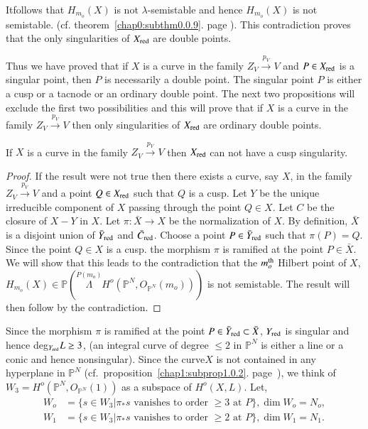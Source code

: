 {It\pageoriginale follows that $H_{m_o}(X)$ is not $\lambda$-semistable
and hence 
$H_{m_o}(X)$ is not semistable. (cf. theorem~\ref{chap0:subthm0.0.9}. 
page \pageref{chap0:subthm0.0.9}). This 
contradiction proves that the only singularities of $X_{\operatorname{red}} $ are
double points. 

Thus we have proved that if $X$ is a curve in the family $Z_V
\xrightarrow{p_V}V$ and $P \in X_{\operatorname{red}}$ is a singular point, then $P$
is necessarily a double point. The singular point $P$ is either a
cusp or a tacnode or an ordinary double point. The next two
propositions will exclude the first  two possibilities and this will
prove that if $X$ is a curve in the family $Z_V \xrightarrow{p_V}V$
then only singularities of $X_{\operatorname{red}}$ are ordinary double points. 

\begin{subprop}\label{chap1:subprop1.0.5} %
If $X$ is a curve in the family $Z_V \xrightarrow{p_V}V$ then
$X_{\operatorname{red}}$ can not have a cusp singularity. 
\end{subprop}

\begin{proof}
If the result were not true then there exists a curve, say $X$, in the
family $Z_V \xrightarrow{p_V}V$ and a point $Q \in X_{\operatorname{red}}$
such that $Q$ is a cusp. Let $Y$ be the unique irreducible component
of $X$ passing through the point $Q \in X$. Let $C$ be the
closure of $X - Y $ in $X$. Let $\pi : \bar{X} \to X$ be the
normalization of $X$. By definition, $\bar{X}$ is a disjoint union of
$\bar{Y}_{\operatorname{red}}$ and $\bar{C}_{\operatorname{red}}$. Choose a point $P \in
\bar{Y}_{\operatorname{red}}$ such that $\pi (P) = Q$. Since the point $Q
\in X$ is a cusp. the morphism $\pi$ is ramified at the point
$P \in \bar{X}$. We will show that this leads to the
contradiction that the $m_o^{\rm th}$ Hilbert point of $X$, $H_{m_o} (X)
\in \mathbb{P} (\overset{P(m_o)}{\Lambda} H^o (\mathbb{P}^N,
O_{\mathbb{P}^N}(m_o)))$ is not semistable. The result will then
follow by the contradiction.  
\end{proof}

Since the morphism $\pi$ is ramified at the point $P \in
\bar{Y}_{\operatorname{red}} \subset \bar{X}$, $Y_{\operatorname{red}}$ is singular and hence
deg$_{Y_{\operatorname{red}}} L \ge 3$, (an integral curve of degree $\leq 2$ in
$\mathbb{P}^N$ is either a line or a conic and hence
nonsingular). Since the curve\pageoriginale $X$ is not contained in
any hyperplane 
in $\mathbb{P}^N$ (cf.\ proposition~\ref{chap1:subprop1.0.2}. 
page~\pageref{chap1:subprop1.0.2}), we think of 
$W_3 = H^o (\mathbb{P}^N, O_{\mathbb{P}^N} (1))$ as a subspace of $H^o
(X, L)$. Let, 
\begin{align*}
W_o & =  \{ s \in W_3 | \pi_*s \text { vanishes to order }
\ge 3 \text { at } P\}, \dim W_o = N_o,\\ 
W_1 & =  \{ s \in W_3 | \pi_* s  \text { vanishes to order }
\ge 2  \text{ at } P\}, \dim W_1 =  N_1. 
\end{align*}

}
